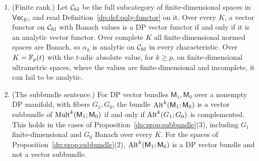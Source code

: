 \begin{theorem}
\begin{enumerate}
\begin{enumerate}
\item If $\operatorname{char}K=p$, $K$ is not spherically complete and $k\ge p$, then $\alpha_k$ is DP and not analytic on $\cC_{\rm um}$. If $\operatorname{char}K=0$, every $\alpha_k$ is analytic.
\item If $\operatorname{char}K=p$, $K$ is densely valued and spherically complete and $k\ge p$, we do not decide whether $\alpha_k$ is analytic on $\cC_{\rm um}$ (\cite[Section~12]{I}; see also Question~\ref{dp:q:residual}). Every vector functor on $\cC_{\rm um}$ whose values have equivalent ultrametric spherically complete norms is DP if and only if it is analytic. For ultrametric Banach spaces $E,D,F,F'$ with $E$ or $D$ of countable type, the hom map of $\alpha_k$ on $\cL(F,F')\times\cL(E,D)$ is the diagonal of a bounded $(k+1)$\nobreakdash-linear map, so it is analytic, in every degree~\cite[Corollary~10.5]{I}.
\end{enumerate}
\item \textup{(Finite rank.)} Let $\mathcal{C}_{\rm fd}$ be the full subcategory of finite-dimensional spaces in $\mathsf{Vec}_K$, and read Definition~\ref{dp:def:poly-functor} on it. Over every $K$, a vector functor on $\mathcal{C}_{\rm fd}$ with Banach values is a DP vector functor if and only if it is an analytic vector functor. Over complete $K$ all finite-dimensional normed spaces are Banach, so $\alpha_k$ is analytic on $\mathcal{C}_{\rm fd}$ in every characteristic. Over $K=\mathbb F_p(t)$ with the $t$-adic absolute value, for $k\ge p$, on finite-dimensional ultrametric spaces, where the values are finite-dimensional and incomplete, it can fail to be analytic.
\item \textup{(The subbundle sentence.)} For DP vector bundles $\mathsf M_1,\mathsf M_0$ over a nonempty DP manifold, with fibers $G_1,G_0$, the bundle $\operatorname{Alt}^k(\mathsf M_1;\mathsf M_0)$ is a vector subbundle of $\operatorname{Mult}^k(\mathsf M_1;\mathsf M_0)$ if and only if $\operatorname{Alt}^k(G_1;G_0)$ is complemented. This holds in the cases of Proposition~\ref{dp:prop:subbundle}\textup{(3)}, including $G_1$ finite-dimensional and $G_0$ Banach over every $K$. For the spaces of Proposition~\ref{dp:prop:subbundle}\textup{(2)}, $\operatorname{Alt}^k(\mathsf M_1;\mathsf M_0)$ is a DP vector bundle and not a vector subbundle.
\end{enumerate}
\end{theorem}

